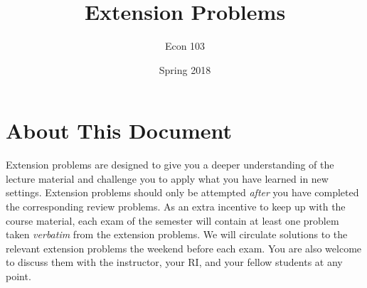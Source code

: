\documentclass[addpoints,12pt]{exam}\usepackage[]{graphicx}\usepackage[]{xcolor}
\title{Extension Problems}
\author{Econ 103}
\date{Spring 2018}
\begin{document}
\maketitle



\section*{About This Document}
Extension problems are designed to give you a deeper understanding of the lecture material and challenge you to apply what you have learned in new settings.
Extension problems should only be attempted \emph{after} you have completed the corresponding review problems.
As an extra incentive to keep up with the course material, each exam of the semester will contain at least one problem taken \emph{verbatim} from the extension problems. 
We will circulate solutions to the relevant extension problems the weekend before each exam.
You are also welcome to discuss them with the instructor, your RI, and your fellow students at any point.



\end{document}
